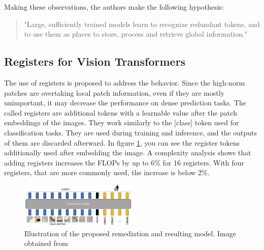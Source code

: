 \documentclass[conference]{IEEEtran}
\begin{document}
  Making these observations, the authors make the following hypothesis:
  \begin{quote}
    "Large, sufficiently trained models learn to recognize redundant tokens, and to use them as places to store, process and retrieve global information." \cite{registers}
  \end{quote}

  \subsection{Registers for Vision Transformers}
  \label{sec:registers:registers}


  The use of registers is proposed to address the behavior. Since the high-norm patches are overtaking local patch information, even if they are mostly unimportant, it may decrease the performance on dense prediction tasks. The called registers are additional tokens with a learnable value after the patch embeddings of the images. They work similarly to the [class] token used for classification tasks. They are used during training and inference, and the outputs of them are discarded afterward. In figure \ref{fig:register-architecture}, you can see the register tokens additionally used after embedding the image. A complexity analysis shows that adding registers increases the FLOPs by up to 6\% for 16 registers. With four registers, that are more commonly used, the increase is below 2\%.

  \begin{figure}
    \centering
    \includegraphics[width=0.5\textwidth]{figures/register-architecture.png}
    \caption{Illustration of the proposed remediation and resulting model. Image obtained from \cite{registers}}
    \label{fig:register-architecture}
  \end{figure}
\end{document}
